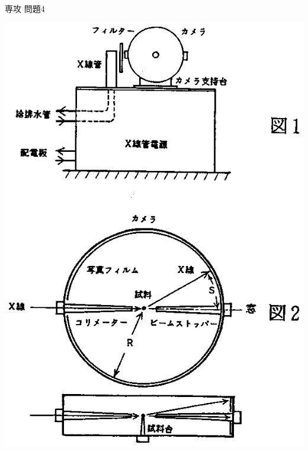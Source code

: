 \documentclass[fleqn]{jbook}
\begin{document}
\begin{question}{専攻 問題4}{}
\begin{subquestions}
\begin{center}
\includegraphics[clip]{1992phy4-1.eps}
\end{center}

\end{subquestions}
\end{question}
\end{document}
